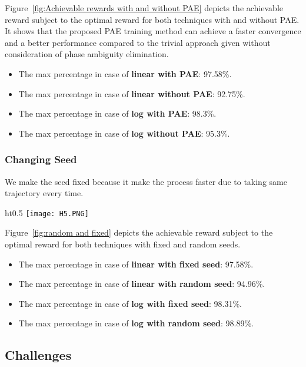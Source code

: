 Figure~\ref{fig:Achievable rewards with and without PAE} depicts the achievable reward subject to the optimal reward for both techniques with and without PAE. It shows that the proposed PAE training method can achieve a faster convergence and a better performance compared to the trivial approach given without consideration of phase ambiguity elimination.
\begin{itemize}
    \item The max percentage in case of \textbf{linear with PAE}: 97.58\%.
    \item The max percentage in case of \textbf{linear without PAE}: 92.75\%.
    \item The max percentage in case of \textbf{log with PAE}: 98.3\%.
    \item The max percentage in case of \textbf{log without PAE}: 95.3\%. 
\end{itemize}

\subsubsection{Changing Seed}
We make the seed fixed because it make the process faster due to taking same trajectory every time. \\
\begin{wrapfigure}[8]{ht}{0.5\textwidth}
    \texttt{[image: H5.PNG]}
    \caption{Training on random and fixed seeds}
    \label{fig:random and fixed}
\end{wrapfigure}
Figure~\ref{fig:random and fixed} depicts the achievable reward subject to the optimal reward for both techniques with fixed and random seeds.
\begin{itemize}
    \item The max percentage in case of \textbf{linear with fixed seed}: 97.58\%.
    \item The max percentage in case of \textbf{linear with random seed}: 94.96\%.
    \item The max percentage in case of \textbf{log with fixed seed}: 98.31\%.
    \item The max percentage in case of \textbf{log with random seed}: 98.89\%. 
\end{itemize}

\subsection{Challenges}
